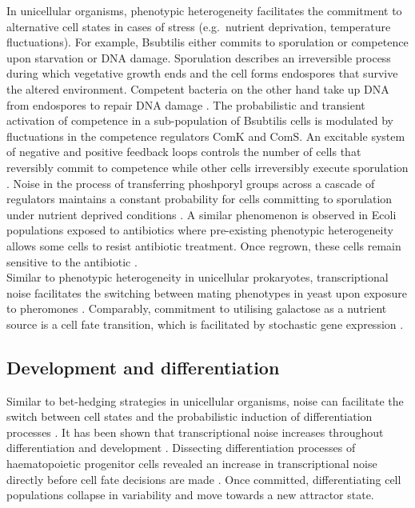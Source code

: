 In unicellular organisms, phenotypic heterogeneity facilitates the commitment to alternative cell states in cases of stress (e.g.~nutrient deprivation, temperature fluctuations). 
For example, \Gls{Bsubtilis} either commits to sporulation or competence upon starvation or DNA damage. 
Sporulation describes an irreversible process during which vegetative growth ends and the cell forms endospores that survive the altered environment. 
Competent bacteria on the other hand take up DNA from endospores to repair DNA damage \citep{Schultz2009}. The probabilistic and transient activation of competence in a sub-population of \Gls{Bsubtilis} cells is modulated by fluctuations in the competence regulators ComK and ComS. 
An excitable system of negative and positive feedback loops controls the number of cells that reversibly commit to competence while other cells irreversibly execute sporulation \citep{Suel2006}. 
Noise in the process of transferring phoshporyl groups across a cascade of regulators maintains a constant probability for cells committing to sporulation under nutrient deprived conditions \citep{Russell2017}. 
A similar phenomenon is observed in \Gls{Ecoli} populations exposed to antibiotics where pre-existing phenotypic heterogeneity allows some cells to resist antibiotic treatment. 
Once regrown, these cells remain sensitive to the antibiotic \citep{Balaban2004}. \\

Similar to phenotypic heterogeneity in unicellular prokaryotes, transcriptional noise facilitates the switching between mating phenotypes in yeast upon exposure to pheromones \citep{Paliwal2007}. 
Comparably, commitment to utilising galactose as a nutrient source is a cell fate transition, which is facilitated by stochastic gene expression \cite{Acar2008}. 

\subsection{Development and differentiation}

Similar to bet-hedging strategies in unicellular organisms, noise can facilitate the switch between cell states and the probabilistic induction of differentiation processes \citep{Eldar2010, Chang2008}. 
It has been shown that transcriptional noise increases throughout differentiation \citep{Stumpf2017} and development \citep{Antolovic2017}. 
Dissecting differentiation processes of haematopoietic progenitor cells revealed an increase in transcriptional noise directly before cell fate decisions are made \citep{Mojtahedi2016, Richard2016}. 
Once committed, differentiating cell populations collapse in variability and move towards a new attractor state. \\

